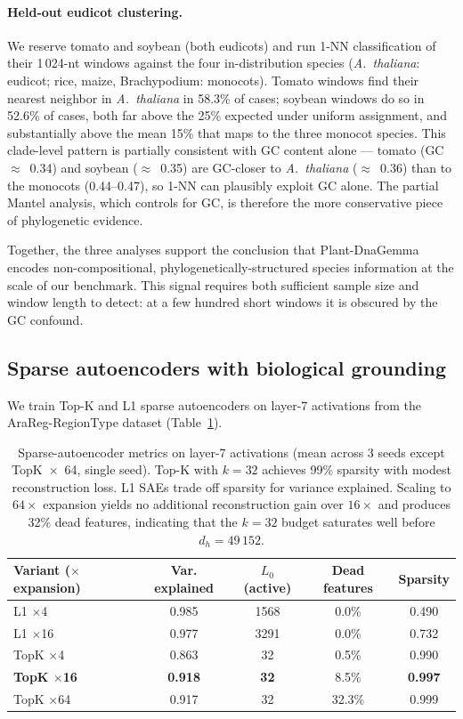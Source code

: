\documentclass[11pt, a4paper]{article}
\begin{document}
\paragraph{Held-out eudicot clustering.}
We reserve tomato and soybean (both eudicots) and run 1-NN classification
of their 1\,024-nt windows against the four in-distribution species
(\textit{A.~thaliana}: eudicot; rice, maize, Brachypodium: monocots).
Tomato windows find their nearest neighbor in \textit{A.~thaliana} in
58.3\% of cases; soybean windows do so in 52.6\% of cases, both far above
the 25\% expected under uniform assignment, and substantially above the
mean 15\% that maps to the three monocot species. This clade-level
pattern is partially consistent with GC content alone --- tomato
(GC~$\approx$~0.34) and soybean ($\approx$~0.35) are GC-closer to
\textit{A.~thaliana} ($\approx$~0.36) than to the monocots (0.44--0.47),
so 1-NN can plausibly exploit GC alone. The partial Mantel analysis,
which controls for GC, is therefore the more conservative piece of
phylogenetic evidence.

Together, the three analyses support the conclusion that Plant-DnaGemma
encodes non-compositional, phylogenetically-structured species information
at the scale of our benchmark. This signal requires both sufficient
sample size and window length to detect: at a few hundred short windows
it is obscured by the GC confound.

\subsection*{Sparse autoencoders with biological grounding}
\label{sec:sae}

We train Top-K and L1 sparse autoencoders on layer-7 activations from
the AraReg-RegionType dataset (Table~\ref{tab:sae}).

\begin{table}[t]
\centering
\small
\caption{Sparse-autoencoder metrics on layer-7 activations (mean across
3 seeds except TopK~$\times$~64, single seed). Top-K with $k{=}32$
achieves 99\% sparsity with modest reconstruction loss. L1 SAEs trade off
sparsity for variance explained. Scaling to $64\times$ expansion yields
no additional reconstruction gain over $16\times$ and produces 32\% dead
features, indicating that the $k{=}32$ budget saturates well before
$d_h = 49\,152$.}
\label{tab:sae}
\begin{tabular}{lcccc}
\toprule
Variant ($\times$ expansion) & Var. explained & $L_0$ (active) & Dead features & Sparsity \\
\midrule
L1 $\times$4     & 0.985 & 1568 & 0.0\% & 0.490 \\
L1 $\times$16    & 0.977 & 3291 & 0.0\% & 0.732 \\
TopK $\times$4   & 0.863 & 32   & 0.5\% & 0.990 \\
\textbf{TopK $\times$16}  & \textbf{0.918} & \textbf{32}   & 8.5\% & \textbf{0.997} \\
TopK $\times$64   & 0.917 & 32   & 32.3\% & 0.999 \\
\bottomrule
\end{tabular}
\end{table}
\end{document}
